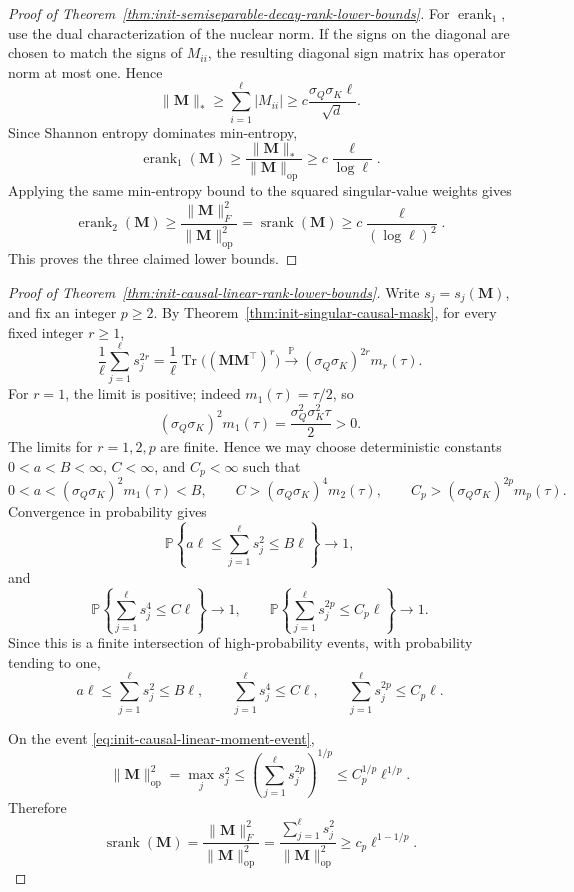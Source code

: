 \documentclass{article}
\newcommand{\Prob}{\mathbb{P}}
\newcommand{\srank}{\operatorname{srank}}
\newcommand{\erank}{\operatorname{erank}}
\newcommand{\op}{\operatorname{op}}
\newcommand{\bM}{\mathbf{M}}
\theoremstyle{definition}
\theoremstyle{remark}
\begin{document}
\begin{proof}[Proof of Theorem~\ref{thm:init-semiseparable-decay-rank-lower-bounds}]
For $\erank_1$, use the dual characterization of the nuclear norm.  If the
signs on the diagonal are chosen to match the signs of $M_{ii}$, the resulting
diagonal sign matrix has operator norm at most one.  Hence
\[
    \|\bM\|_*
    \geq
    \sum_{i=1}^{\ell}|M_{ii}|
    \geq
    c\frac{\sigma_Q\sigma_K\ell}{\sqrt d}.
\]
Since Shannon entropy dominates min-entropy,
\[
    \erank_1(\bM)
    \geq
    \frac{\|\bM\|_*}{\|\bM\|_{\op}}
    \geq
    c\frac{\ell}{\log\ell}.
\]
Applying the same min-entropy bound to the squared singular-value weights gives
\[
    \erank_2(\bM)
    \geq
    \frac{\|\bM\|_F^2}{\|\bM\|_{\op}^2}
    =
    \srank(\bM)
    \geq
    c\frac{\ell}{(\log\ell)^2}.
\]
This proves the three claimed lower bounds.
\end{proof}

\begin{proof}[Proof of Theorem~\ref{thm:init-causal-linear-rank-lower-bounds}]
Write $s_j=s_j(\bM)$, and fix an integer $p\geq2$.  By
Theorem~\ref{thm:init-singular-causal-mask}, for every fixed integer $r\geq1$,
\[
    \frac1\ell\sum_{j=1}^{\ell}s_j^{2r}
    =
    \frac1\ell\operatorname{Tr}\bigl((\bM\bM^\top)^r\bigr)
    \xrightarrow{\Prob}
    (\sigma_Q\sigma_K)^{2r}m_r(\tau).
\]
For $r=1$, the limit is positive; indeed $m_1(\tau)=\tau/2$, so
\[
    (\sigma_Q\sigma_K)^2m_1(\tau)
    =
    \frac{\sigma_Q^2\sigma_K^2\tau}{2}
    >
    0.
\]
The limits for $r=1,2,p$ are finite.  Hence we may choose deterministic
constants $0<a<B<\infty$, $C<\infty$, and $C_p<\infty$ such that
\[
    0<a<(\sigma_Q\sigma_K)^2m_1(\tau)<B,
    \qquad
    C>(\sigma_Q\sigma_K)^4m_2(\tau),
    \qquad
    C_p>(\sigma_Q\sigma_K)^{2p}m_p(\tau).
\]
Convergence in probability gives
\[
    \Prob\left\{
    a\ell\leq \sum_{j=1}^{\ell}s_j^2\leq B\ell
    \right\}\to1,
\]
and
\[
    \Prob\left\{
    \sum_{j=1}^{\ell}s_j^4\leq C\ell
    \right\}\to1,
    \qquad
    \Prob\left\{
    \sum_{j=1}^{\ell}s_j^{2p}\leq C_p\ell
    \right\}\to1.
\]
Since this is a finite intersection of high-probability events, with probability
tending to one,
\begin{equation}
    a\ell\leq \sum_{j=1}^{\ell}s_j^2\leq B\ell,
    \qquad
    \sum_{j=1}^{\ell}s_j^4\leq C\ell,
    \qquad
    \sum_{j=1}^{\ell}s_j^{2p}\leq C_p\ell.
    \label{eq:init-causal-linear-moment-event}
\end{equation}

On the event \eqref{eq:init-causal-linear-moment-event},
\[
    \|\bM\|_{\op}^2
    =
    \max_j s_j^2
    \leq
    \left(\sum_{j=1}^{\ell}s_j^{2p}\right)^{1/p}
    \leq
    C_p^{1/p}\ell^{1/p}.
\]
Therefore
\[
    \srank(\bM)
    =
    \frac{\|\bM\|_F^2}{\|\bM\|_{\op}^2}
    =
    \frac{\sum_{j=1}^{\ell}s_j^2}{\|\bM\|_{\op}^2}
    \geq
    c_p\ell^{1-1/p}.
\]


\end{proof}
\end{document}
